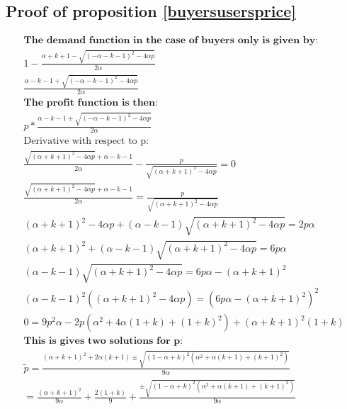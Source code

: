 \subsection{Proof of proposition \ref{buyersusersprice}} \label{buyersuserspriceproof}

\begin{align*}
\textbf{The demand function in the case of buyers only is given by:} \\
1-\frac{\alpha+k+1-\sqrt{(-\alpha-k-1)^2-4 \alpha p}}{2 \alpha} \\
\frac{\alpha-k-1+\sqrt{(-\alpha-k-1)^2-4 \alpha p}}{2 \alpha}
\\
\textbf{The profit function is then:} 
\\
p*\frac{\alpha-k-1+\sqrt{(-\alpha-k-1)^2-4 \alpha p}}{2 \alpha}
\\
\text{Derivative with respect to p}: \\
\frac{\sqrt{(\alpha+k+1)^2-4 \alpha p}+\alpha-k-1}{2 \alpha}-\frac{p}{\sqrt{(\alpha+k+1)^2-4 \alpha p}} =0
\\
\frac{\sqrt{(\alpha+k+1)^2-4 \alpha p}+\alpha-k-1}{2 \alpha} =\frac{p}{\sqrt{(\alpha+k+1)^2-4 \alpha p}} \\
( \alpha+k+1)^2-4 \alpha p+(\alpha-k-1)\sqrt{(\alpha+k+1)^2-4 \alpha p} = 2 p \alpha \\
( \alpha+k+1)^2+(\alpha-k-1)\sqrt{(\alpha+k+1)^2-4 \alpha p} = 6 p \alpha \\
(\alpha-k-1)\sqrt{(\alpha+k+1)^2-4 \alpha p} = 6 p \alpha - ( \alpha+k+1)^2 \\
(\alpha-k-1)^2((\alpha+k+1)^2-4 \alpha p) = (6 p \alpha - ( \alpha+k+1)^2 )^2
\\
0 = 9 p^2 \alpha  -2 p (\alpha^2 + 4\alpha(1+k)+(1+k)^2) + ( \alpha+k+1)^2 (1+k)
\\
\textbf{This is gives two solutions for p:} \\
\tilde{p} = \frac{(\alpha+k+1)^2+2\alpha(k+1) \pm \sqrt{(1-\alpha+k)^2(\alpha^2+\alpha (k+1)+(k+1)^2)}}{9 \alpha} \\
 = \frac{(\alpha+k+1)^2}{9 \alpha}+\frac{2(1+k)}{9}+\frac{ \pm \sqrt{(1-\alpha+k)^2(\alpha^2+\alpha (k+1)+(k+1)^2)}}{9 \alpha} \\
\end{align*}

